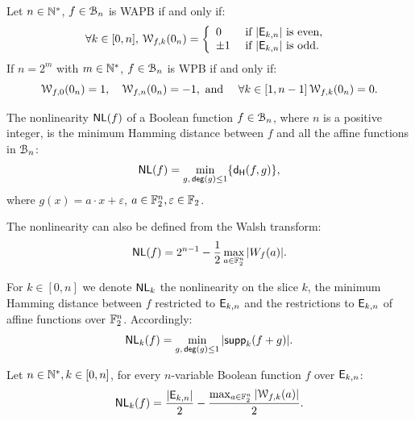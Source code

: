 \documentclass[11pt]{llncs}
\begin{document}
\begin{Prop}\label{prop:WAPBWalsh}
	
Let $n\in \mathbb{N}^*$, $f\in \mathcal{B}_{n}$ is WAPB if and only if:
\[\forall k \in [0,n], \, \mathcal{W}_{f,k}(0_n)=   
\left \{
\begin{array}{l l}
0  & \text{ if } |\mathsf{E}_{k,n}| \text{ is even, } \\
\pm 1 & \text{ if }  |\mathsf{E}_{k,n}| \text{ is odd.}
\end{array}\right. \] 
If $n=2^m$ with $m\in \mathbb{N}^*$, $f\in \mathcal{B}_{n}$ is WPB if and only if:
\[\mathcal{W}_{f,0}(0_n)=1, \quad \mathcal{W}_{f,n}(0_n)=-1, \text{ and } \quad \forall k \in [1,n-1] \,  \mathcal{W}_{f,k}(0_n)=0. \] 
	
\end{Prop}

\begin{definition} \label{def:nl}
	The nonlinearity $\mathsf{NL}(f)$ of a Boolean function $f\in \mathcal{B}_n$, where $n$ is a positive integer, is the minimum Hamming distance between $f$ and all the affine functions in $\mathcal{B}_n$:
	\[ \mathsf{NL}(f) = \min_{g,\, \mathsf{deg}(g)\leq 1} \{ \mathsf{d_H}(f,g) \}{,} \]
	where $g(x)=a\cdot x+\varepsilon$, $a\in \mathbb{F}_2^n, \varepsilon\in \mathbb{F}_2$. 
	
	The nonlinearity can also be defined from the Walsh transform:
	\[ \mathsf{NL}(f) = 2^{n-1}- \frac{1}{2} \max_{a\in \mathbb{F}_2^n}{|W_{f}(a)|}. \]
	
	
	For $k\in [0,n]$ we denote $\mathsf{NL}_{k}$ the nonlinearity on the slice $k$, the minimum Hamming distance between $f$ restricted to $\mathsf{E}_{k,n}$ and the restrictions to $\mathsf{E}_{k,n}$ of affine functions over $\mathbb{F}_2^n$. 
	Accordingly: 
	\[\mathsf{NL}_{k}(f)=\min_{g,\, \mathsf{deg}(g)\leq 1} |\mathsf{supp}_{k}(f+g)|.\]
\end{definition}


\begin{Prop}\label{prop:nlk}
	Let $n\in \mathbb{N}^*, k\in [0,n]$, for every $n$-variable Boolean function $f$ over $\mathsf{E}_{k,n}$:
	\[ \mathsf{NL}_{k}(f)=\frac{|\mathsf{E}_{k,n}|}{2} -\frac{\max_{a\in \mathbb{F}_2^n} |\mathcal{W}_{f,k}(a)|}{2}  .\]
\end{Prop}
\end{document}
